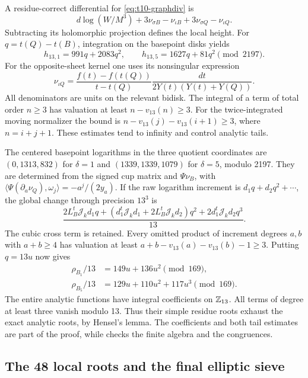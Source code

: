 A residue-correct differential for \eqref{eq:t10-graphdiv} is
\[
 d\log(W/M^3)+3\nu_{\sigma B}-\nu_{\iota B}
                         +3\nu_{\sigma Q}-\nu_{\iota Q}.
\]
Subtracting its holomorphic projection defines the local height.
For $q=t(Q)-t(B)$, integration on the basepoint disks yields
\[
 h_{13,1}=991q+2083q^2,\qquad
 h_{13,5}=1627q+81q^2\pmod{2197}.
\]
For the opposite-sheet kernel one uses its nonsingular expression
\[
 \nu_{\iota Q}=
 \frac{f(t)-f(t(Q))}{t-t(Q)}
              \frac{dt}{2Y(t)(Y(t)+Y(Q))}.
\]
All denominators are units on the relevant bidisk. The integral of a
term of total order $n\geq3$ has valuation at least
$n-v_{13}(n)\geq3$. For the twice-integrated moving normalizer the
bound is $n-v_{13}(j)-v_{13}(i+1)\geq3$, where $n=i+j+1$.
These estimates tend to infinity and control analytic tails.

The centered basepoint logarithms in the three quotient coordinates
are $(0,1313,832)$ for $\delta=1$ and $(1339,1339,1079)$ for
$\delta=5$, modulo 2197. They are determined from the signed cup
matrix and $\Psi\nu_B$, with
$\langle\Psi(\partial_a\nu_Q),\omega_j\rangle=-a^j/(2y_a)$.
If the raw logarithm increment is $d_1q+d_2q^2+\cdots$, the global
change through precision $13^3$ is
\[
 \frac{2L_B^t\mathcal J_kd_1q+
 (d_1^t\mathcal J_kd_1+2L_B^t\mathcal J_kd_2)q^2+
 2d_1^t\mathcal J_kd_2q^3}{13}.
\]
The cubic cross term is retained. Every omitted product of increment
degrees $a,b$ with $a+b\geq4$ has valuation at least
$a+b-v_{13}(a)-v_{13}(b)-1\geq3$.
Putting $q=13u$ now gives
\begin{align}\label{eq:t10-rhoseries}
 \rho_{B_1}/13&=149u+136u^2\pmod{169},\\
 \rho_{B_5}/13&=129u+110u^2+117u^3\pmod{169}.\nonumber
\end{align}
The entire analytic functions have integral coefficients on
$\mathbb Z_{13}$. All terms of degree at least three vanish modulo
13. Thus their simple residue roots exhaust the exact analytic roots,
by Hensel's lemma. The coefficients and both tail estimates are part
of the proof, while  checks the
finite algebra and the congruences.

\subsection{The 48 local roots and the final elliptic sieve}

